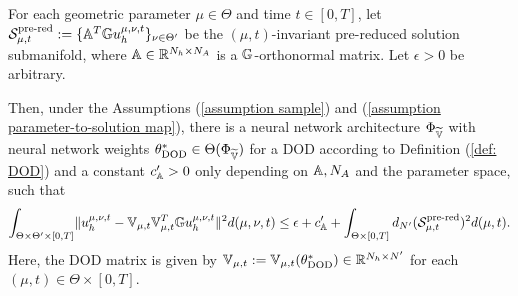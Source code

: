 \begin{proposition} \label{prop: DOD Existence}
    For each geometric parameter $\mu \in \Theta$ and time $t \in [0, T]$, let $\mathcal{S}^\text{pre-red}_{\mu, t} :=
    \{ \mathbb{A}^T \mathbb{G} u_h^{\mu, \nu, t} \}_{\nu \in \Theta'}$ be the 
    $(\mu, t)$-invariant pre-reduced solution submanifold, where $\mathbb{A} \in \mathbb{R}^{N_h \times N_A}$ is a 
    $\mathbb{G}$-orthonormal matrix. Let $\epsilon > 0$ be arbitrary.

    Then, under the Assumptions (\ref{assumption sample}) and (\ref{assumption parameter-to-solution map}), 
    there is a neural network architecture $\Phi_{\widetilde{\mathbb{V}}}$ with
    neural network weights $\theta_\text{DOD}^* \in \Theta(\Phi_{\widetilde{\mathbb{V}}})$ 
    for a DOD according to Definition (\ref{def: DOD}) and
    a constant $c_{\mathbb{A}}' > 0$ only depending on $\mathbb{A}, N_A$ and the parameter space, such that
    \begin{equation*}
        \int_{\Theta \times \Theta' \times [0, T]} 
        \lVert u_h^{\mu, \nu, t} - \mathbb{V}_{\mu, t} \mathbb{V}_{\mu, t}^T \mathbb{G} u_h^{\mu, \nu, t} \rVert^2 d(\mu, \nu, t)
        \leq \epsilon  + c_{\mathbb{A}}' + \int_{\Theta \times [0, T]} d_{N'}(\mathcal{S}^\text{pre-red}_{\mu, t})^2 d(\mu, t).
    \end{equation*}
    Here, the DOD matrix is given by
    $\mathbb{V}_{\mu, t} := \mathbb{V}_{\mu, t}(\theta_\text{DOD}^*) \in \mathbb{R}^{N_h \times N'}$ for each $(\mu, t) \in \Theta \times [0, T]$.
\end{proposition}
